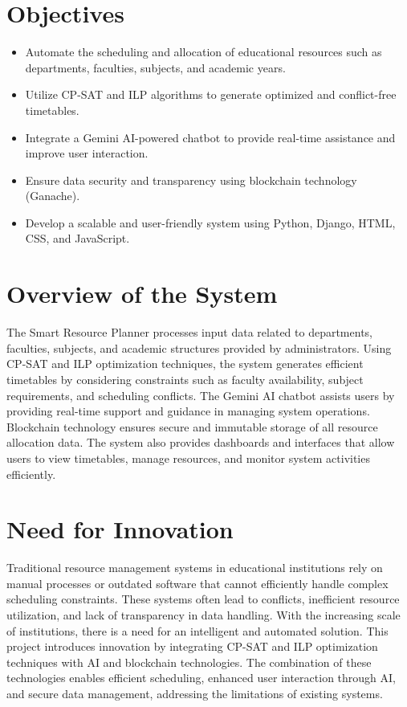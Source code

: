 \documentclass[a4paper, 12pt]{report}
\begin{document}
\section{Objectives}
\begin{itemize}
    \item Automate the scheduling and allocation of educational resources such as departments, faculties, subjects, and academic years.
    \item Utilize CP-SAT and ILP algorithms to generate optimized and conflict-free timetables.
    \item Integrate a Gemini AI-powered chatbot to provide real-time assistance and improve user interaction.
    \item Ensure data security and transparency using blockchain technology (Ganache).
    \item Develop a scalable and user-friendly system using Python, Django, HTML, CSS, and JavaScript.
\end{itemize}

\section{Overview of the System}
\par The Smart Resource Planner processes input data related to departments, faculties, subjects, and academic structures provided by administrators. Using CP-SAT and ILP optimization techniques, the system generates efficient timetables by considering constraints such as faculty availability, subject requirements, and scheduling conflicts. The Gemini AI chatbot assists users by providing real-time support and guidance in managing system operations. Blockchain technology ensures secure and immutable storage of all resource allocation data. The system also provides dashboards and interfaces that allow users to view timetables, manage resources, and monitor system activities efficiently.

\section{Need for Innovation}
\par Traditional resource management systems in educational institutions rely on manual processes or outdated software that cannot efficiently handle complex scheduling constraints. These systems often lead to conflicts, inefficient resource utilization, and lack of transparency in data handling. With the increasing scale of institutions, there is a need for an intelligent and automated solution. This project introduces innovation by integrating CP-SAT and ILP optimization techniques with AI and blockchain technologies. The combination of these technologies enables efficient scheduling, enhanced user interaction through AI, and secure data management, addressing the limitations of existing systems.
\end{document}
